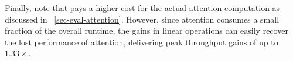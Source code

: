 Finally, note that \sysname pays a higher cost for the actual attention computation as discussed in ~\autoref{sec-eval-attention}. However, since attention consumes a small fraction of the overall runtime, the gains in linear operations can easily recover the lost performance of attention, delivering peak throughput gains of up to $1.33\times$. 
\fi




